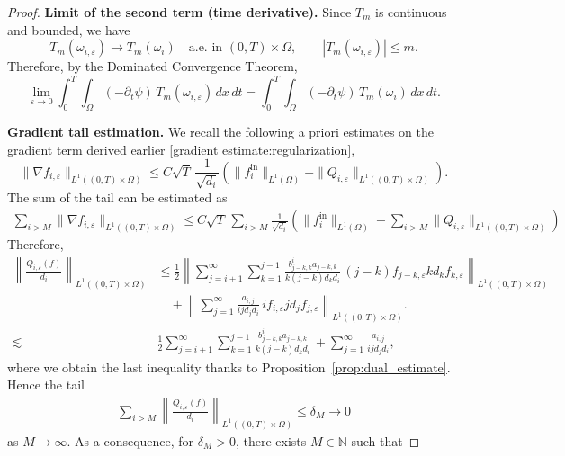 \documentclass[a4paper,12pt,reqno]{amsart}
\theoremstyle{plain}
\numberwithin{equation}{section}
\begin{document}
\begin{proof}
		\medskip
		\noindent\textbf{Limit of the second term (time derivative).}
		Since $T_m$ is continuous and bounded, we have
		\[
		T_m(\omega_{i,\varepsilon}) \to T_m(\omega_i)
		\quad \text{a.e. in } (0,T)\times\Omega,
		\qquad
		|T_m(\omega_{i,\varepsilon})|\le m .
		\]
		Therefore, by the Dominated Convergence Theorem,
		\[
		\lim_{\varepsilon\to0}
		\int_{0}^{T}\!\!\int_{\Omega}
		(-\partial_t\psi)\,T_m(\omega_{i,\varepsilon})\,dx\,dt
		=
		\int_{0}^{T}\!\!\int_{\Omega}
		(-\partial_t\psi)\,T_m(\omega_i)\,dx\,dt .
		\]
		
		\medskip
		\noindent\textbf{Gradient tail estimation.}
		We recall the following a priori estimates on the gradient term derived earlier \eqref{gradient estimate:regularization}, 
		\[
		\|\nabla f_{i,\varepsilon}\|_{L^1((0,T)\times\Omega)}
		\le
		C\sqrt{T}\,\frac{1}{\sqrt{d_i}}
		\left(
		\|f_i^{\mathrm{in}}\|_{L^1(\Omega)}
		+
		\|Q_{i,\varepsilon}\|_{L^1((0,T)\times\Omega)}
		\right).
		\]
		The sum of the tail can be estimated as 
		\begin{align}\label{gradient uniform sum}
			\sum_{i>M}
			\|\nabla f_{i,\varepsilon}\|_{L^1((0,T)\times\Omega)}
			\le C\sqrt{T}\, \sum_{i>M}\frac{1}{\sqrt{d_i}}
			\left(
			\|f_i^{\mathrm{in}}\|_{L^1(\Omega)}
			+
			\sum_{i>M}\|Q_{i,\varepsilon}\|_{L^1((0,T)\times\Omega)}
			\right)
		\end{align}
		Therefore,
		\begin{align*}
			\left\|
			\frac{Q_{i,\varepsilon}(f)}{d_i}
			\right\|_{L^1((0,T)\times\Omega)}
			&\le
			\frac{1}{2}\left\|
			\sum_{j=i+1}^{\infty} \sum_{k=1}^{j-1}
			\frac{b_{j-k,k}^i a_{j-k,k}}{k(j-k)d_{k}d_i}\,
			(j-k)f_{j-k,\varepsilon} kd_kf_{k,\varepsilon}
			\right\|_{L^1((0,T)\times\Omega)}
			\\
			&\quad+
			\left\|
			\sum_{j=1}^{\infty}
			\frac{a_{i,j}}{ijd_jd_i}\, if_{i,\varepsilon} jd_jf_{j,\varepsilon}
			\right\|_{L^1((0,T)\times\Omega)}.\\
			\lesssim & \frac{1}{2}
			\sum_{j=i+1}^{\infty} \sum_{k=1}^{j-1}
			\frac{b_{j-k,k}^i a_{j-k,k}}{k(j-k)d_{k}d_i}\,
			+ \sum_{j=1}^{\infty}
			\frac{a_{i,j}}{ijd_jd_i},
		\end{align*}
		where we obtain the last inequality thanks to Proposition~\ref{prop:dual_estimate}. Hence the tail 
		\begin{align}\label{tail control source}
			{\sum_{i>M}\left\|
				\frac{Q_{i,\varepsilon}(f)}{d_i}
				\right\|_{L^1((0,T)\times\Omega)}\le \delta_M \to 0}
		\end{align}
		as $M\to\infty$. As a consequence, for $\delta_M>0$, there exists $M\in\mathbb{N}$ such that

\end{proof}
\end{document}
